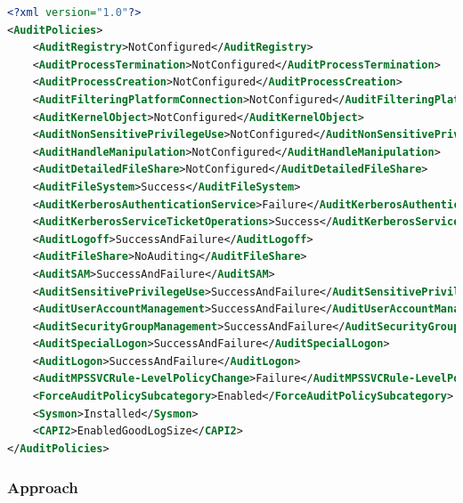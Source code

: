 \begin{lstlisting}[caption=Example Result Audit Policy Analysis, language=xml]
<?xml version="1.0"?>
<AuditPolicies>
    <AuditRegistry>NotConfigured</AuditRegistry>
    <AuditProcessTermination>NotConfigured</AuditProcessTermination>
    <AuditProcessCreation>NotConfigured</AuditProcessCreation>
    <AuditFilteringPlatformConnection>NotConfigured</AuditFilteringPlatformConnection>
    <AuditKernelObject>NotConfigured</AuditKernelObject>
    <AuditNonSensitivePrivilegeUse>NotConfigured</AuditNonSensitivePrivilegeUse>
    <AuditHandleManipulation>NotConfigured</AuditHandleManipulation>
    <AuditDetailedFileShare>NotConfigured</AuditDetailedFileShare>
    <AuditFileSystem>Success</AuditFileSystem>
    <AuditKerberosAuthenticationService>Failure</AuditKerberosAuthenticationService>
    <AuditKerberosServiceTicketOperations>Success</AuditKerberosServiceTicketOperations>
    <AuditLogoff>SuccessAndFailure</AuditLogoff>
    <AuditFileShare>NoAuditing</AuditFileShare>
    <AuditSAM>SuccessAndFailure</AuditSAM>
    <AuditSensitivePrivilegeUse>SuccessAndFailure</AuditSensitivePrivilegeUse>
    <AuditUserAccountManagement>SuccessAndFailure</AuditUserAccountManagement>
    <AuditSecurityGroupManagement>SuccessAndFailure</AuditSecurityGroupManagement>
    <AuditSpecialLogon>SuccessAndFailure</AuditSpecialLogon>
    <AuditLogon>SuccessAndFailure</AuditLogon>
    <AuditMPSSVCRule-LevelPolicyChange>Failure</AuditMPSSVCRule-LevelPolicyChange>
    <ForceAuditPolicySubcategory>Enabled</ForceAuditPolicySubcategory>
    <Sysmon>Installed</Sysmon>
    <CAPI2>EnabledGoodLogSize</CAPI2>
</AuditPolicies>
\end{lstlisting}

\subsubsection{Approach}
